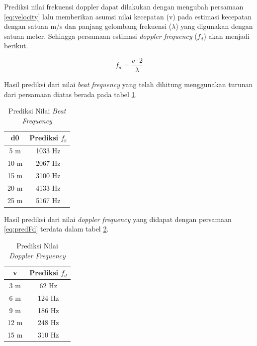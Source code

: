 Prediksi nilai frekuensi doppler dapat dilakukan dengan mengubah persamaan \ref{eq:velocity} lalu memberikan asumsi nilai kecepatan (v) pada estimasi kecepatan dengan satuan m/s dan panjang gelombang frekuensi ($\lambda$) yang digunakan dengan satuan meter. Sehingga persamaan estimasi \textit{doppler frequency} ($f_{d}$) akan menjadi berikut.

\begin{equation}
	\nonumber
	f_{d} = \frac{v \cdot 2}{\lambda}
	\label{eq:predFd}
\end{equation}

Hasil prediksi dari nilai \textit{beat frequency} yang telah dihitung menggunakan turunan dari persamaan diatas berada pada tabel \ref{tab:predFbeat}.

\begin{center}
	\begin{longtable}{|c|c|}
		\caption{Prediksi Nilai \textit{Beat Frequency}}
		\label{tab:predFbeat}\\
		\hline
		d0 & Prediksi $f_{b}$  \\
		\hline
		5 m & 1033 Hz\\
		\hline
		10 m & 2067 Hz\\
		\hline
		15 m & 3100 Hz\\
		\hline
		20 m & 4133 Hz\\
		\hline
		25 m & 5167 Hz\\
		\hline
	\end{longtable}
\end{center}

Hasil prediksi dari nilai \textit{doppler frequency} yang didapat dengan persamaan \ref{eq:predFd} terdata dalam tabel \ref{tab:predFdopp}.

\begin{center}
	\begin{longtable}{|c|c|}
		\caption{Prediksi Nilai \textit{Doppler Frequency}}
		\label{tab:predFdopp}\\
		\hline
		v & Prediksi $f_{d}$  \\
		\hline
		3 m & 62 Hz\\
		\hline
		6 m & 124 Hz\\
		\hline
		9 m & 186 Hz\\
		\hline
		12 m & 248 Hz\\
		\hline
		15 m & 310 Hz\\
		\hline
	\end{longtable}
\end{center}